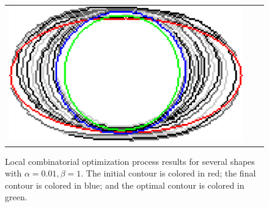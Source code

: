 \begin{figure}[hp!]
\begin{tabular}{ccc}
	\includegraphics[scale=0.25]{figures/chapter5/flow/ellipse/radius_5/ii/elastica/len_pen_0.01000/jonctions_1/best/gs_0.25000/summary.pdf}				
\end{tabular}
		\caption{Local combinatorial optimization process results for several shapes with $\alpha=0.01,\beta=1$. The initial contour is colored in red; the final contour is colored in blue; and the optimal contour is colored in green.}	
		\label{fig:local-comb-ii5-results}
\end{figure}


